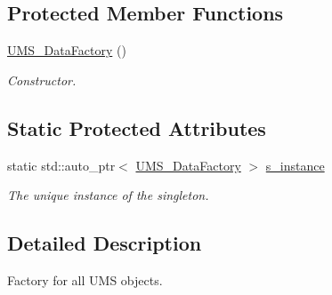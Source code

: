 \subsection*{Protected Member Functions}
\begin{DoxyCompactItemize}
\item 
\hypertarget{classUMS__Data_1_1UMS__DataFactory_a792d45ee2b535e91bea90cf1d5171b6e}{
\hyperlink{classUMS__Data_1_1UMS__DataFactory_a792d45ee2b535e91bea90cf1d5171b6e}{UMS\_\-DataFactory} ()}
\label{classUMS__Data_1_1UMS__DataFactory_a792d45ee2b535e91bea90cf1d5171b6e}

\begin{DoxyCompactList}\small\item\em Constructor. \item\end{DoxyCompactList}\end{DoxyCompactItemize}
\subsection*{Static Protected Attributes}
\begin{DoxyCompactItemize}
\item 
\hypertarget{classUMS__Data_1_1UMS__DataFactory_aecaa18e0aae14f3cda88d59cf6f7ff65}{
static std::auto\_\-ptr$<$ \hyperlink{classUMS__Data_1_1UMS__DataFactory}{UMS\_\-DataFactory} $>$ \hyperlink{classUMS__Data_1_1UMS__DataFactory_aecaa18e0aae14f3cda88d59cf6f7ff65}{s\_\-instance}}
\label{classUMS__Data_1_1UMS__DataFactory_aecaa18e0aae14f3cda88d59cf6f7ff65}

\begin{DoxyCompactList}\small\item\em The unique instance of the singleton. \item\end{DoxyCompactList}\end{DoxyCompactItemize}


\subsection{Detailed Description}
Factory for all UMS objects. 

